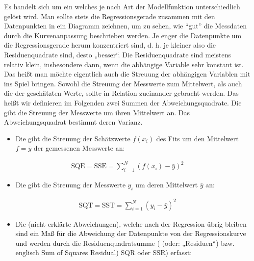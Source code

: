 \documentclass[letterpaper,10pt,english]{jupyterBook}
\begin{document}
\sphinxAtStartPar
Es handelt sich um ein  welches je nach Art der Modellfunktion unterschiedlich gelöst wird. Man sollte stets die Regressionsgerade zusammen mit den Datenpunkten in ein Diagramm zeichnen, um zu sehen, wie “gut” die Messdaten durch die Kurvenanpassung beschrieben werden.
Je enger die Datenpunkte um die Regressionsgerade herum konzentriert sind, d. h. je kleiner also die Residuenquadrate sind, desto „besser“. Die Residuenquadrate sind meistens relativ klein, insbesondere dann, wenn die abhängige Variable sehr konstant ist. Das heißt man möchte eigentlich auch die Streuung der abhängigen Variablen mit ins Spiel bringen.
Sowohl die Streuung der Messwerte zum Mittelwert, als auch die der geschätzten Werte, sollte in Relation zueinander gebracht werden. Das heißt wir definieren im Folgenden zwei Summen der Abweichungsquadrate. Die  gibt die Streuung der Messwerte um ihren Mittelwert an. Das  Abweichungsquadrat bestimmt deren Varianz.
\begin{itemize}
\item {} 
\sphinxAtStartPar
Die  gibt die Streuung der Schätzwerte \(f(x_i)\) des Fits um den Mittelwert \(\bar f = \bar y\) der gemessenen Messwerte an:

\end{itemize}
\begin{equation*}
\begin{split}\mathrm{SQE} = \mathrm{SSE} = \sum_{i=1}^N (f(x_i) - \bar y)^2\end{split}
\end{equation*}\begin{itemize}
\item {} 
\sphinxAtStartPar
Die  gibt die Streuung der Messwerte \(y_i\) um deren Mittelwert \(\bar y\) an:

\end{itemize}
\begin{equation*}
\begin{split}\mathrm{SQT} = \mathrm{SST} = \sum_{i=1}^N (y_i - \bar y)^2\end{split}
\end{equation*}\begin{itemize}
\item {} 
\sphinxAtStartPar
Die  (nicht erklärte Abweichungen), welche nach der Regression übrig bleiben sind ein Maß für die Abweichung der Datenpunkte von der Regressionskurve und werden durch die Residuenquadratsumme ( (oder: „Residuen“) bzw. englisch Sum of Squares Residual) SQR oder SSR) erfasst:

\end{itemize}
\end{document}
